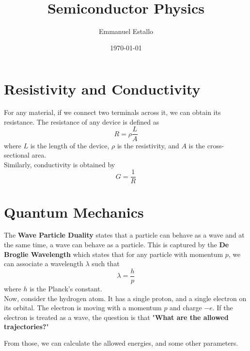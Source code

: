 \documentclass{article}
\title{Semiconductor Physics}
\author{Emmanuel Estallo}
\date{\today}
\begin{document}
\maketitle 
\noindent 
\section{Resistivity and Conductivity}
For any material, if we connect two terminals across it, we can obtain its resistance.
The resistance of any device is defined as $$R = \rho \frac{L}{A}$$ where $L$ is the
length of the device, $\rho$ is the resistivity, and $A$ is the cross-sectional area. 
\vspace{8pt}
\\ Similarly, conductivity is obtained by $$G = \frac{1}{R}$$

\section{Quantum Mechanics}
\noindent 
The \textbf{Wave Particle Duality} states that a particle can behave as a wave and at 
the same time, a wave can behave as a particle. This is captured by the 
\textbf{De Broglie Wavelength} which states that for any particle with momentum $p$,
we can associate a wavelength $\lambda$ such that $$\lambda = \frac{h}{p}$$ where $h$
is the Planck's constant.  
\vspace{8pt}
\\ Now, consider the hydrogen atom. It has a single proton, and a single electron on
its orbital. The electron is moving with a momentum $p$ and charge $-e$. If the electron
is treated as a wave, the question is that "\textbf{What are the allowed trajectories?}" 

\vspace{8pt}
\noindent 
From those, we can calculate the allowed energies, and some other parameters. 
\end{document}
